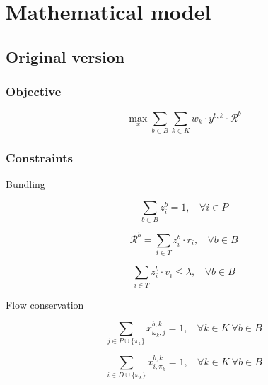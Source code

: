 \documentclass[12pt ]{article}
\begin{document}
\setcounter{secnumdepth}{0} %

\section{Mathematical model}

\subsection{Original version}
\subsubsection{Objective}

\begin{equation}
	\max_x \sum_{ b \in B} \sum_{k \in K} w_k \cdot y^{b,k} \cdot \mathcal{R}^b
	\label{eq:maxExpectedReward}	
\end{equation}
\vspace{0.5cm}

\subsubsection{Constraints}


Bundling

\begin{equation}
	\sum_{ b \in B} z_{i}^{b} = 1,~~~~\forall i \in P
	\label{eq:taskMembership}
\end{equation}

\begin{equation}
	\mathcal{R}^b = \sum_{ i \in T} z_{i}^{b} \cdot r_i,~~~~\forall b \in B
	\label{eq:bundleReward}
\end{equation}

\begin{equation}
	\sum_{ i \in T} z_{i}^{b} \cdot v_i \le \lambda,~~~~\forall b \in B
	\label{eq:volThreshold}
\end{equation}


\noindent Flow conservation

\begin{equation}
	\sum_{ j \in P \cup \{ \pi_k \} } x_{\omega_k, j}^{b, k} = 1,~~~~\forall k \in K ~\forall b \in B	
	\label{eq:flowBegin}
\end{equation}

\begin{equation}
	\sum_{ i \in D \cup \{\omega_k\} } x_{i,\pi_k}^{b,k} = 1,~~~~\forall k \in K ~\forall b \in B	
	\label{eq:flowEnd}
\end{equation}
\end{document}
